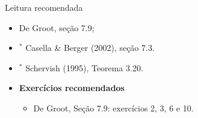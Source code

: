 \begin{frame}{Leitura recomendada}
\begin{itemize}
 \item[\faBook] De Groot, seção 7.9;
 \item[\faBook] $^\ast$ Casella \& Berger (2002), seção 7.3.
 \item[\faBook] $^\ast$ Schervish (1995),  Teorema 3.20.
 \item {\large\textbf{Exercícios recomendados}}
 \begin{itemize}
  \item[\faBookmark] De Groot, Seção 7.9: exercícios 2, 3, 6 e 10.
  \end{itemize}
 \end{itemize} 
\end{frame}
